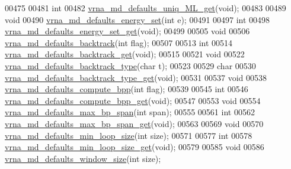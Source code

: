 \begin{DoxyCode}
00475 
00481 \textcolor{keywordtype}{int}
00482 \hyperlink{group__model__details_gab48e70fd024bf838404bcbcca0c874a0}{vrna\_md\_defaults\_uniq\_ML\_get}(\textcolor{keywordtype}{void});
00483 
00489 \textcolor{keywordtype}{void}
00490 \hyperlink{group__model__details_ga8dd29c55787a4576277e1907e92d810c}{vrna\_md\_defaults\_energy\_set}(\textcolor{keywordtype}{int} e);
00491 
00497 \textcolor{keywordtype}{int}
00498 \hyperlink{group__model__details_ga017ed6afb1cba2b7f242412cab618b53}{vrna\_md\_defaults\_energy\_set\_get}(\textcolor{keywordtype}{void});
00499 
00505 \textcolor{keywordtype}{void}
00506 \hyperlink{group__model__details_ga978c468b2fe96a70d5191e3dd17d5599}{vrna\_md\_defaults\_backtrack}(\textcolor{keywordtype}{int} flag);
00507 
00513 \textcolor{keywordtype}{int}
00514 \hyperlink{group__model__details_ga90da1156e6883ddd68527c2830706648}{vrna\_md\_defaults\_backtrack\_get}(\textcolor{keywordtype}{void});
00515 
00521 \textcolor{keywordtype}{void}
00522 \hyperlink{group__model__details_ga68305274de96b56b7799575e222560d8}{vrna\_md\_defaults\_backtrack\_type}(\textcolor{keywordtype}{char} t);
00523 
00529 \textcolor{keywordtype}{char}
00530 \hyperlink{group__model__details_ga1425b4ebd0e034dead66d79becd64143}{vrna\_md\_defaults\_backtrack\_type\_get}(\textcolor{keywordtype}{void});
00531 
00537 \textcolor{keywordtype}{void}
00538 \hyperlink{group__model__details_gaf1b5db10f1f476767f9a95f8a78e3132}{vrna\_md\_defaults\_compute\_bpp}(\textcolor{keywordtype}{int} flag);
00539 
00545 \textcolor{keywordtype}{int}
00546 \hyperlink{group__model__details_gaa3a537e61fbe0518673bf9f73fd820f3}{vrna\_md\_defaults\_compute\_bpp\_get}(\textcolor{keywordtype}{void});
00547 
00553 \textcolor{keywordtype}{void}
00554 \hyperlink{group__model__details_ga4c4bc962f09b4480cb8499f1cf8ae4ec}{vrna\_md\_defaults\_max\_bp\_span}(\textcolor{keywordtype}{int} span);
00555 
00561 \textcolor{keywordtype}{int}
00562 \hyperlink{group__model__details_gaa60f989e062fecd4d4bac89c1883da85}{vrna\_md\_defaults\_max\_bp\_span\_get}(\textcolor{keywordtype}{void});
00563 
00569 \textcolor{keywordtype}{void}
00570 \hyperlink{group__model__details_gac152f1e78c1058a10261022c8dfda0f7}{vrna\_md\_defaults\_min\_loop\_size}(\textcolor{keywordtype}{int} size);
00571 
00577 \textcolor{keywordtype}{int}
00578 \hyperlink{group__model__details_ga5cc691174a75c652807dc361b617632a}{vrna\_md\_defaults\_min\_loop\_size\_get}(\textcolor{keywordtype}{void});
00579 
00585 \textcolor{keywordtype}{void}
00586 \hyperlink{group__model__details_ga7b802ce0e8c3181bf5cb580de6d5b26a}{vrna\_md\_defaults\_window\_size}(\textcolor{keywordtype}{int} size);

\end{DoxyCode}
